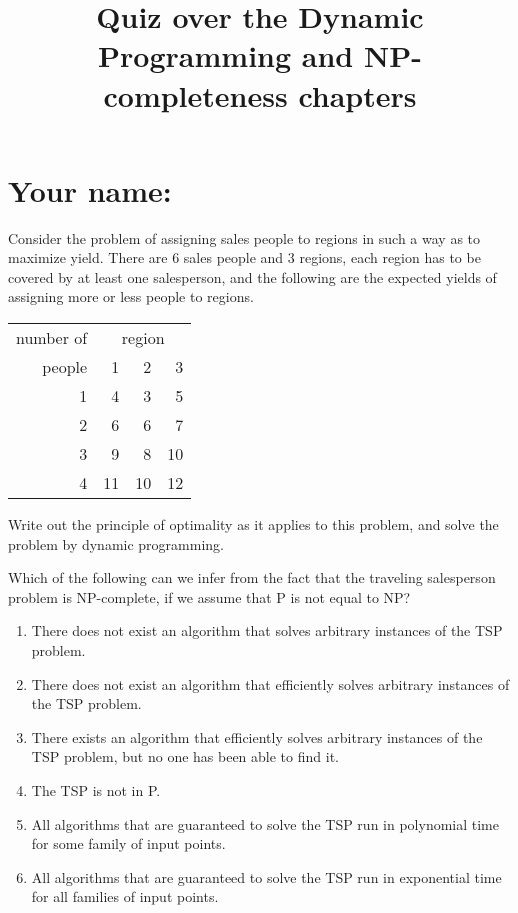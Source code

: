 \documentclass{artikel3}
\begin{document}
\pagestyle{empty}
\title{Quiz over the Dynamic Programming and NP-completeness chapters}
\author{}\date{}\maketitle

\section*{Your name:}

\vskip1cm

Consider the problem of assigning sales people to regions in such a
way as to maximize yield. There are 6
sales people and 3 regions, each region has to be covered by at least
one salesperson, and the following are the expected yields of
assigning more or less people to regions.

\begin{tabular}{r|rrr}
number of&\multicolumn{3}{c}{region}\\
people&1&2&3\\
\hline
1&4&3&5\\
2&6&6&7\\
3&9&8&10\\
4&11&10&12
\end{tabular}

Write out the principle of optimality as it applies to this problem,
and solve the problem by dynamic programming.
\vskip 1cm

Which of the following can we infer from the fact that the traveling
    salesperson problem is NP-complete, if we assume that P is not equal to NP?
\begin{enumerate}
\item There does not exist an algorithm that solves arbitrary instances of
        the TSP problem.
\item There does not exist an algorithm that efficiently solves arbitrary
        instances of the TSP problem.
\item There exists an algorithm that efficiently solves arbitrary instances
        of the TSP problem, but no one has been able to find it.
\item The TSP is not in P.
\item All algorithms that are guaranteed to solve the TSP run in polynomial
        time for some family of input points.
\item All algorithms that are guaranteed to solve the TSP run in exponential
        time for all families of input points.
\end{enumerate}
\end{document}
